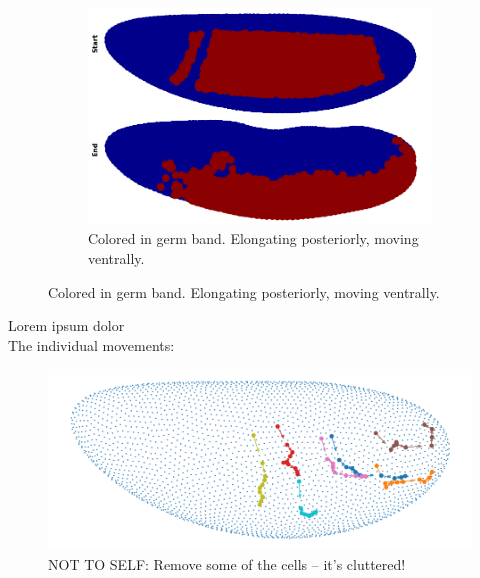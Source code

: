 \begin{figure}[H]
\begin{subfigure}[b]{0.25\textwidth}
    \end{subfigure}
     \hfill
    \begin{subfigure}[b]{0.7\textwidth}
    \includegraphics[width=\textwidth]{chapters/Results/figures/gb_firstframe_lastframe.png}
    \caption{Colored in germ band. Elongating posteriorly, moving ventrally.}
    \end{subfigure}
    
\end{figure}


Lorem ipsum dolor 
\\

The individual movements:

\begin{figure}[H]
    \centering
    \includegraphics[width=1\linewidth]{chapters/Results/figures/movements.png}
    \caption{NOT TO SELF: Remove some of the cells -- it's cluttered!}
    \label{fig:enter-label}
\end{figure}


